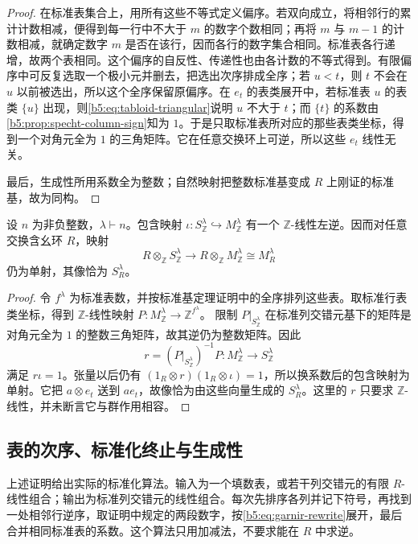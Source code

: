 \begin{proof}
	在标准表集合上，用所有这些不等式定义偏序。若双向成立，将相邻行的累计计数相减，便得到每一行中不大于 \(m\) 的数字个数相同；再将 \(m\) 与 \(m-1\) 的计数相减，就确定数字 \(m\) 是否在该行，因而各行的数字集合相同。标准表各行递增，故两个表相同。这个偏序的自反性、传递性也由各计数的不等式得到。有限偏序中可反复选取一个极小元并删去，把选出次序排成全序；若 \(u<t\)，则 \(t\) 不会在 \(u\) 以前被选出，所以这个全序保留原偏序。在 \(e_t\) 的表类展开中，若标准表 \(u\) 的表类 \(\{u\}\) 出现，则\eqref{b5:eq:tabloid-triangular}说明 \(u\) 不大于 \(t\)；而 \(\{t\}\) 的系数由\cref{b5:prop:specht-column-sign}知为 \(1\)。于是只取标准表所对应的那些表类坐标，得到一个对角元全为 \(1\) 的三角矩阵。它在任意交换环上可逆，所以这些 \(e_t\) 线性无关。

	最后，生成性所用系数全为整数；自然映射把整数标准基变成 \(R\) 上刚证的标准基，故为同构。
\end{proof}

\begin{corollary}\label{b5:cor:specht-base-change-inclusion}
	设 \(n\) 为非负整数，\(\lambda\vdash n\)。包含映射 \(\iota:S_{\mathbb Z}^\lambda\hookrightarrow M_{\mathbb Z}^\lambda\) 有一个 \(\mathbb Z\)-线性左逆。因而对任意交换含幺环 \(R\)，映射
	\[
		R\otimes_{\mathbb Z}S_{\mathbb Z}^\lambda \longrightarrow R\otimes_{\mathbb Z}M_{\mathbb Z}^\lambda \cong M_R^\lambda
	\]
	仍为单射，其像恰为 \(S_R^\lambda\)。
\end{corollary}
\begin{proof}
	令 \(f^\lambda\) 为标准表数，并按标准基定理证明中的全序排列这些表。取标准行表类坐标，得到 \(\mathbb Z\)-线性映射 \(P:M_{\mathbb Z}^\lambda\rightarrow\mathbb Z^{f^\lambda}\)。 限制 \(P|_{S_{\mathbb Z}^\lambda}\) 在标准列交错元基下的矩阵是对角元全为 \(1\) 的整数三角矩阵，故其逆仍为整数矩阵。因此
	\[
		r=(P|_{S_{\mathbb Z}^\lambda})^{-1}P: M_{\mathbb Z}^\lambda\longrightarrow S_{\mathbb Z}^\lambda
	\]
	满足 \(r\iota=1\)。张量以后仍有 \((1_R\otimes r)(1_R\otimes\iota)=1\)，所以换系数后的包含映射为单射。它把 \(a\otimes e_t\) 送到 \(ae_t\)，故像恰为由这些向量生成的 \(S_R^\lambda\)。这里的 \(r\) 只要求 \(\mathbb Z\)-线性，并未断言它与群作用相容。
\end{proof}

\subsection{表的次序、标准化终止与生成性}
\label{b5:subsec:0603:02}

上述证明给出实际的标准化算法。输入为一个填数表，或若干列交错元的有限 \(R\)-线性组合；输出为标准列交错元的线性组合。每次先排序各列并记下符号，再找到一处相邻行逆序，取证明中规定的两段数字，按\eqref{b5:eq:garnir-rewrite}展开，最后合并相同标准表的系数。这个算法只用加减法，不要求能在 \(R\) 中求逆。


